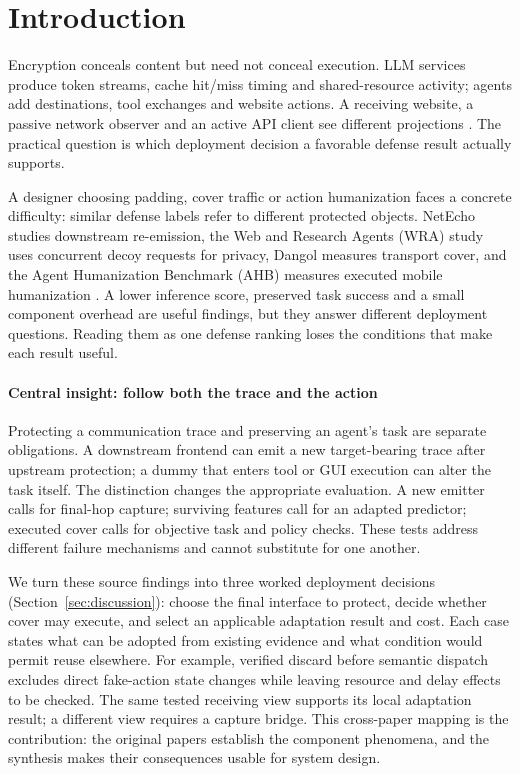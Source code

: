 \section{Introduction}\label{sec:introduction}
Encryption conceals content but need not conceal execution. LLM services produce token streams, cache hit/miss timing and shared-resource activity; agents add destinations, tool exchanges and website actions. A receiving website, a passive network observer and an active API client see different projections \cite{weiss2024prompt,promptpeek2025,earlybird2025,agentprint2025,uitraces2026,jeong2026wra}. The practical question is which deployment decision a favorable defense result actually supports.

A designer choosing padding, cover traffic or action humanization faces a concrete difficulty: similar defense labels refer to different protected objects. NetEcho studies downstream re-emission, the Web and Research Agents (WRA) study uses concurrent decoy requests for privacy, Dangol measures transport cover, and the Agent Humanization Benchmark (AHB) measures executed mobile humanization \cite{netecho2025,jeong2026wra,dangol2026workflow,zhu2026turing}. A lower inference score, preserved task success and a small component overhead are useful findings, but they answer different deployment questions. Reading them as one defense ranking loses the conditions that make each result useful.

\paragraph{Central insight: follow both the trace and the action}
Protecting a communication trace and preserving an agent's task are separate obligations. A downstream frontend can emit a new target-bearing trace after upstream protection; a dummy that enters tool or GUI execution can alter the task itself. The distinction changes the appropriate evaluation. A new emitter calls for final-hop capture; surviving features call for an adapted predictor; executed cover calls for objective task and policy checks. These tests address different failure mechanisms and cannot substitute for one another.

We turn these source findings into three worked deployment decisions (Section~\ref{sec:discussion}): choose the final interface to protect, decide whether cover may execute, and select an applicable adaptation result and cost. Each case states what can be adopted from existing evidence and what condition would permit reuse elsewhere. For example, verified discard before semantic dispatch excludes direct fake-action state changes while leaving resource and delay effects to be checked. The same tested receiving view supports its local adaptation result; a different view requires a capture bridge. This cross-paper mapping is the contribution: the original papers establish the component phenomena, and the synthesis makes their consequences usable for system design.

